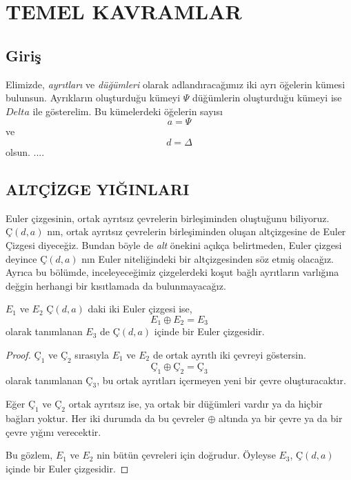 \documentclass[11pt]{amsbook}
\begin{document}
\tableofcontents

\chapter{TEMEL KAVRAMLAR}



\section{Giriş}

Elimizde, \emph{ayrıtları} ve \emph{düğümleri} olarak adlandıracağımız 
iki ayrı öğelerin kümesi bulunsun.
Ayrıkların oluşturduğu kümeyi $\Psi$
düğümlerin oluşturduğu kümeyi ise $Delta$ ile gösterelim. 
Bu kümelerdeki öğelerin sayısı
\[
	a = {\Psi}
\]
ve
\[
	d = {\Delta}
\]
olsun.
....



\section{ALTÇİZGE YIĞINLARI}

Euler çizgesinin, ortak ayrıtsız çevrelerin birleşiminden oluştuğunu biliyoruz. 
$Ç(d, a)$ nın, ortak ayrıtsız çevrelerin birleşiminden oluşan altçizgesine de Euler Çizgesi diyeceğiz. 
Bundan böyle de \emph{alt} önekini açıkça belirtmeden, 
Euler çizgesi deyince $Ç(d, a)$ nın Euler niteliğindeki bir altçizgesinden söz etmiş olacağız. 
Ayrıca bu bölümde, inceleyeceğimiz çizgelerdeki koşut bağlı ayrıtların varlığına 
değgin herhangi bir kısıtlamada da bulunmayacağız.
\begin{theorem}
	$E_1$ ve $E_2$ $Ç(d, a)$ daki iki Euler çizgesi ise,
	\[
		E_1 \oplus E_2 = E_3
	\]
	olarak tanımlanan $E_3$ de $Ç(d, a)$ içinde bir Euler çizgesidir.
\end{theorem}
\begin{proof}
	$Ç_1$ ve $Ç_2$ sırasıyla $E_1$ ve $E_2$ de ortak ayrıtlı iki çevreyi göstersin.
	\[
		Ç_1 \oplus Ç_2 = Ç_3
	\]
	olarak tanımlanan $Ç_3$, bu ortak ayrıtları içermeyen yeni bir çevre oluşturacaktır.

    Eğer $Ç_1$ ve $Ç_2$ ortak ayrıtsız ise, ya ortak bir düğümleri vardır ya da hiçbir bağları yoktur. 
    Her iki durumda da bu çevreler $\oplus$ altında ya bir çevre ya da bir çevre yığını verecektir.

    Bu gözlem, $E_1$ ve $E_2$ nin bütün çevreleri için doğrudur. 
    Öyleyse $E_3$, $Ç(d, a)$ içinde bir Euler çizgesidir.
\end{proof}
\end{document}

